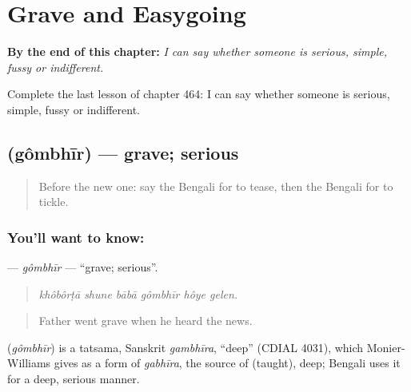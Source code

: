 
\chapter{Grave and Easygoing}
\label{ch:bn-grave-and-easygoing}

\begin{chapteropening}
\textbf{By the end of this chapter:} \emph{I can say whether someone is serious, simple, fussy or indifferent.}

Complete the last lesson of chapter 464: I can say whether someone is serious, simple, fussy or indifferent.
\end{chapteropening}

\section[\texorpdfstring{\bn{গম্ভীর} (gômbhīr)}{গম্ভীর (gômbhīr)}]{ (gômbhīr) — grave; serious}

\label{lesson:BN-C464-gombhir}



\begin{quote}
Before the new one: say the Bengali for to tease, then the Bengali for to tickle.
\end{quote}

\subsection*{You'll want to know: }
\textbf{} — \emph{gômbhīr} — \textquotedblleft{}grave; serious\textquotedblright{}.

\begin{quote}
     
\end{quote}

\begin{quote}
\emph{khôbôrṭā shune bābā gômbhīr hôye gelen.}
\end{quote}

\begin{quote}
Father went grave when he heard the news.
\end{quote}

\begin{cousinweb}
\textbf{} (\emph{gômbhīr}) is a tatsama, Sanskrit \emph{gambhīra}, \textquotedblleft{}deep\textquotedblright{} (CDIAL 4031), which Monier-Williams gives as a form of \emph{gabhīra}, the source of  (taught), deep; Bengali uses it for a deep, serious manner.
\end{cousinweb}

